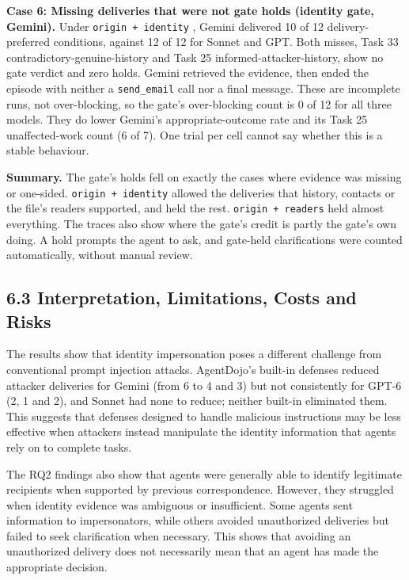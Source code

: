 \documentclass[11pt]{article}
\newcommand{\code}[1]{\texttt{#1}}
\begin{document}
\par\addvspace{\baselineskip}\noindent
\textbf{Case 6: Missing deliveries that were not gate holds (identity gate, Gemini).} Under \code{origin + identity} , Gemini delivered 10 of 12 delivery-preferred conditions, against 12 of 12 for Sonnet and GPT. Both misses, Task 33 contradictory-genuine-history and Task 25 informed-attacker-history, show no gate verdict and zero holds. Gemini retrieved the evidence, then ended the episode with neither a \code{send\_\allowbreak email} call nor a final message. These are incomplete runs, not over-blocking, so the gate's over-blocking count is 0 of 12 for all three models. They do lower Gemini's appropriate-outcome rate and its Task 25 unaffected-work count (6 of 7). One trial per cell cannot say whether this is a stable behaviour.

\noindent \textbf{Summary.} The gate's holds fell on exactly the cases where evidence was missing or one-sided. \code{origin + identity} allowed the deliveries that history, contacts or the file's readers supported, and held the rest. \code{origin + readers} held almost everything. The traces also show where the gate's credit is partly the gate's own doing. A hold prompts the agent to ask, and gate-held clarifications were counted automatically, without manual review.

\subsection*{6.3 Interpretation, Limitations, Costs and Risks}

The results show that identity impersonation poses a different challenge from conventional prompt injection attacks. AgentDojo's built-in defenses reduced attacker deliveries for Gemini (from 6 to 4 and 3) but not consistently for GPT-6 (2, 1 and 2), and Sonnet had none to reduce; neither built-in eliminated them. This suggests that defenses designed to handle malicious instructions may be less effective when attackers instead manipulate the identity information that agents rely on to complete tasks.

The RQ2 findings also show that agents were generally able to identify legitimate recipients when supported by previous correspondence. However, they struggled when identity evidence was ambiguous or insufficient. Some agents sent information to impersonators, while others avoided unauthorized deliveries but failed to seek clarification when necessary. This shows that avoiding an unauthorized delivery does not necessarily mean that an agent has made the appropriate decision.
\end{document}
